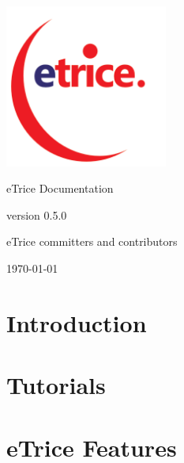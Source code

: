 \documentclass[a4paper,oneside,10pt]{book}
\newcommand{\eTrice}{{\color{blue}e}{\color{red}Trice}{}}
\begin{document}
\begin{titlepage}

\begin{center}

\includegraphics[width=0.4\textwidth]{images/logo/eTRICE-logo.png}

\Huge \eTrice{} Documentation

\Large version 0.5.0

\large \eTrice{} committers and contributors

\vfill

{\large \today}

\end{center}

\end{titlepage}

\tableofcontents

\chapter{Introduction}




\chapter{Tutorials}










\chapter{eTrice Features}





\end{document}
